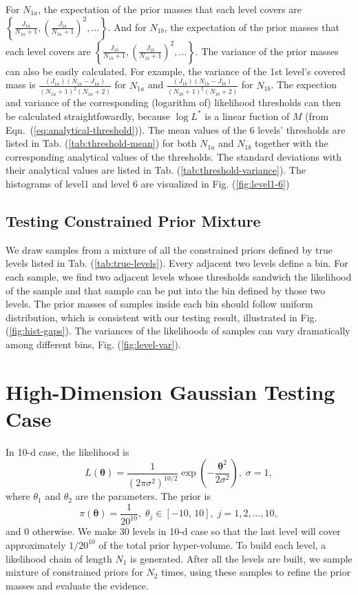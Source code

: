 \documentclass[letterpaper, preprint]{aastex}
\begin{document}
For $N_{1a}$, the expectation of the prior masses that each level covers are $\left\{\frac{J_{1a}}{N_{1a}+1},\left(\frac{J_{1a}}{N_{1a}+1}\right)^2,\ldots\right\}$. And for $N_{1b}$, the expectation of the prior masses that each level covers are $\left\{\frac{J_{1b}}{N_{1b}+1},\left(\frac{J_{1b}}{N_{1b}+1}\right)^2,\ldots\right\}$. The variance of the prior masses can also be easily calculated. For example, the variance of the 1st level's covered mass is $\frac{(J_{1a})(N_{1a}-J_{1a})}{(N_{1a}+1)^2(N_{1a}+2)}$ for $N_{1a}$ and $\frac{(J_{1b})(N_{1b}-J_{1b})}{(N_{1b}+1)^2(N_{1b}+2)}$ for $N_{1b}$. The expection and variance of the corresponding (logarithm of) likelihood thresholds can then be calculated straightfowardly, because $\log{L^*}$ is a linear fuction of $M$ (from Eqn.~(\ref{eq:analytical-threshold})). The mean values of the 6 levels' thresholds are listed in Tab. (\ref{tab:threshold-mean}) for both $N_{1a}$ and $N_{1b}$ together with the corresponding analytical values of the thresholds. The standard deviations with their analytical values are listed in Tab. (\ref{tab:threshold-variance}). The histograms of level1 and level 6 are visualized in Fig. (\ref{fig:level1-6})


\subsection{Testing Constrained Prior Mixture}
We draw samples from a mixture of all the constrained priors defined by true levels listed in Tab. (\ref{tab:true-levels}). Every adjacent two levels define a bin. For each sample, we find two adjacent levels whose thresholds sandwich the likelihood of the sample and that sample can be put into the bin defined by those two levels. The prior masses of samples inside each bin should follow uniform distribution, which is consistent with our testing result, illustrated in Fig. (\ref{fig:hist-gaps}). The variances of the likelihoods of samples can vary dramatically among different bins, Fig. (\ref{fig:level-var}).

\section{High-Dimension Gaussian Testing Case}

In 10-d case, the likelihood is
\begin{equation}
L(\boldsymbol{\theta})=\frac{1}{(2\pi\sigma^2)^{10/2}}\exp{\left(-\frac{\boldsymbol{\theta}^2}{2\sigma^2}\right)},\;\sigma = 1,
\label{eq:likelihood10}
\end{equation}
where $\theta_1$ and $\theta_2$ are the parameters. The prior is
\begin{equation}
\pi(\boldsymbol{\theta}) = \frac{1}{20^{10}},\;\theta_j\in[-10,\,10],\;j=1,2,\ldots,10,
\label{eq:prior10}
\end{equation}
and 0 otherwise. We make 30 levels in 10-d case so that the last level will cover approximately $1/20^{10}$ of the total prior hyper-volume. To build each level, a likelihood chain of length $N_1$ is generated. After all the levels are built, we sample mixture of constrained priors for $N_2$ times, using these samples to refine the prior masses and evaluate the evidence.
\end{document}

